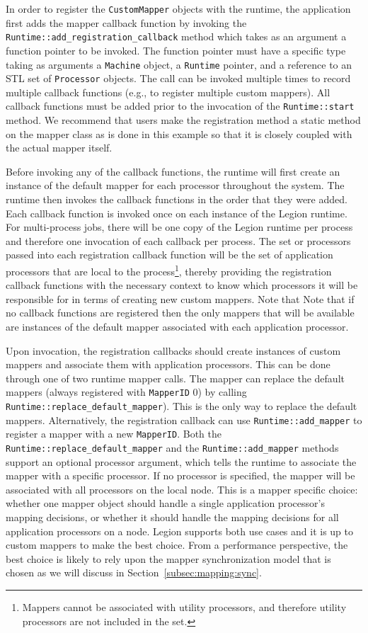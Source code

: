In order to register the {\tt CustomMapper} objects with the runtime, the
application first adds the mapper callback function by invoking the
{\tt Runtime::add\_registration\_callback} method which takes as an
argument a function pointer to be invoked. The function pointer must
have a specific type taking as arguments a {\tt Machine} object, 
a {\tt Runtime} pointer, and a reference to an STL set of {\tt Processor}
objects. The call can be invoked multiple times to record multiple
callback functions (e.g., to register multiple custom mappers). All
callback functions must be added prior to the invocation of the 
{\tt Runtime::start} method. We recommend that users make the registration
method a static method on the mapper class as is done in this example
so that it is closely coupled with the actual mapper itself.

Before invoking any of the callback functions, the runtime will first
create an instance of the default mapper for each processor throughout
the system. The runtime then invokes the callback functions in the order
that they were added. Each callback function is invoked once on each 
instance of the Legion runtime. For multi-process jobs, there will be 
one copy of the Legion runtime per process and therefore one invocation
of each callback per process. The set or processors passed into each 
registration callback function will be the set of application processors 
that are local to the process\footnote{Mappers cannot be associated with
utility processors, and therefore utility processors are not included
in the set.}, thereby providing the registration callback
functions with the necessary context to know which processors it will
be responsible for in terms of creating new custom mappers. Note that
Note that if no callback functions are registered then the only mappers
that will be available are instances of the default mapper associated
with each application processor.

Upon invocation, the registration callbacks should create instances
of custom mappers and associate them with application processors. 
This can be done through one of two runtime mapper calls. The mapper
can replace the default mappers (always registered with {\tt MapperID}
0) by calling {\tt Runtime::replace\_default\_mapper}). This is the
only way to replace the default mappers. Alternatively, the registration
callback can use {\tt Runtime::add\_mapper} to register a mapper with a
new {\tt MapperID}. Both the {\tt Runtime::replace\_default\_mapper} and
the {\tt Runtime::add\_mapper} methods support an optional processor
argument, which tells the runtime to associate the mapper with a specific
processor. If no processor is specified, the mapper will be associated 
with all processors on the local node. This is a mapper specific choice:
whether one mapper object should handle a single application processor's
mapping decisions, or whether it should handle the mapping decisions for
all application processors on a node. Legion supports both use cases
and it is up to custom mappers to make the best choice. From a performance
perspective, the best choice is likely to rely upon the mapper synchronization
model that is chosen as we will discuss in Section~\ref{subsec:mapping:sync}.

